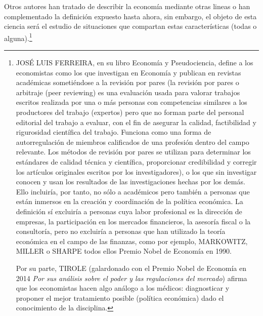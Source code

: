 \documentclass[10pt,a4paper]{article}
\begin{document}
Otros autores han tratado de describir la economía mediante otras lineas o han complementado la definición expuesto hasta ahora, sin embargo, el objeto de esta ciencia será el estudio de situaciones que compartan estas características (todas o alguna).\footnote{%
    JOSÉ LUIS FERREIRA, en su libro Economía y Pseudociencia, define a los economistas como los que investigan en Economía y publican en revistas académicas sometiéndose a la revisión por pares (la revisión por pares o arbitraje (peer reviewing) es una evaluación usada para valorar trabajos escritos realizada por una o más personas con competencias similares a los productores del trabajo (expertos) pero que no forman parte del personal editorial del trabajo a evaluar, con el fin de asegurar la calidad, factibilidad y rigurosidad científica del trabajo. Funciona como una forma de autorregulación de miembros calificados de una profesión dentro del campo relevante. Los métodos de revisión por pares se utilizan para determinar los estándares de calidad técnica y científica, proporcionar credibilidad y corregir los artículos originales escritos por los investigadores), o los que sin investigar conocen y usan los resultados de las investigaciones hechas por los demás. Ello incluiría, por tanto, no sólo a académicos pero también a personas que están inmersos en la creación y coordinación de la política económica. La definición sí excluiría a personas cuya labor profesional es la dirección de empresas, la participación en los mercados financieros, la asesoría fiscal o la consultoría, pero no excluiría a personas que han utilizado la teoría económica en el campo de las finanzas, como por ejemplo, MARKOWITZ, MILLER o SHARPE todos ellos Premio Nobel de Economía en 1990. 

Por su parte, TIROLE (galardonado con el Premio Nobel de Economía en 2014 \textit{Por sus análisis sobre el poder y las regulaciones del mercado}) afirma que los economistas hacen algo análogo a los médicos: diagnosticar y proponer el mejor tratamiento posible (política económica) dado el conocimiento de la disciplina.
}
\end{document}
